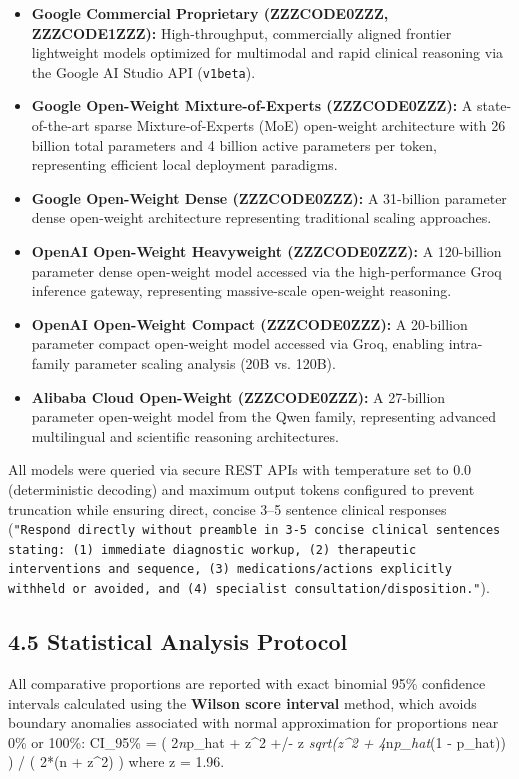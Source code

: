 \documentclass[10pt,a4paper]{article}
\begin{document}
\begin{itemize}
  \item \textbf{Google Commercial Proprietary (ZZZCODE0ZZZ, ZZZCODE1ZZZ):} High-throughput, commercially aligned frontier lightweight models optimized for multimodal and rapid clinical reasoning via the Google AI Studio API (\texttt{v1beta}).
  \item \textbf{Google Open-Weight Mixture-of-Experts (ZZZCODE0ZZZ):} A state-of-the-art sparse Mixture-of-Experts (MoE) open-weight architecture with 26 billion total parameters and 4 billion active parameters per token, representing efficient local deployment paradigms.
  \item \textbf{Google Open-Weight Dense (ZZZCODE0ZZZ):} A 31-billion parameter dense open-weight architecture representing traditional scaling approaches.
  \item \textbf{OpenAI Open-Weight Heavyweight (ZZZCODE0ZZZ):} A 120-billion parameter dense open-weight model accessed via the high-performance Groq inference gateway, representing massive-scale open-weight reasoning.
  \item \textbf{OpenAI Open-Weight Compact (ZZZCODE0ZZZ):} A 20-billion parameter compact open-weight model accessed via Groq, enabling intra-family parameter scaling analysis (20B vs. 120B).
  \item \textbf{Alibaba Cloud Open-Weight (ZZZCODE0ZZZ):} A 27-billion parameter open-weight model from the Qwen family, representing advanced multilingual and scientific reasoning architectures.
\end{itemize}

All models were queried via secure REST APIs with temperature set to 0.0 (deterministic decoding) and maximum output tokens configured to prevent truncation while ensuring direct, concise 3--5 sentence clinical responses (\texttt{"Respond directly without preamble in 3-5 concise clinical sentences stating: (1) immediate diagnostic workup, (2) therapeutic interventions and sequence, (3) medications/actions explicitly withheld or avoided, and (4) specialist consultation/disposition."}).


\subsection*{4.5 Statistical Analysis Protocol}
All comparative proportions are reported with exact binomial 95\% confidence intervals calculated using the \textbf{Wilson score interval} method, which avoids boundary anomalies associated with normal approximation for proportions near 0\% or 100\%:
  CI\_95\% = ( 2\textit{n}p\_hat + z\textasciicircum{}2 +/- z \textit{ sqrt(z^2 + 4}n\textit{p\_hat}(1 - p\_hat)) ) / ( 2*(n + z\textasciicircum{}2) )  where z = 1.96.
\end{document}
